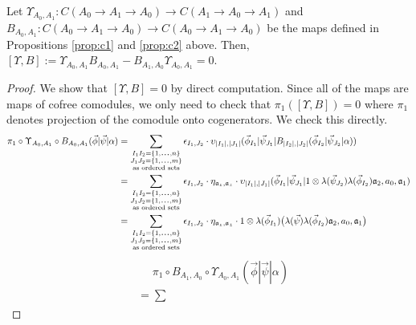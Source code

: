 \begin{prop}
\label{prop:c3}
Let $\Upsilon_{A_0,A_1}: 
C(A_0 \to A_1 \to A_0) \longrightarrow
C(A_1 \to A_0 \to A_1)$ and 
$B_{A_0,A_1}:C(A_0 \to A_1 \to A_0) 
\longrightarrow C(A_0 \to A_1 \to A_0)$ 
be the maps defined in Propositions 
\ref{prop:c1} and \ref{prop:c2} above. 
Then, $[\Upsilon, B] := 
\Upsilon_{A_0,A_1} B_{A_0,A_1} - 
B_{A_1,A_0}\Upsilon_{A_0,A_1} = 0$.
\end{prop}
%
\begin{proof}
We show that $[\Upsilon, B] = 0$ by direct 
computation. Since all of the maps are maps 
of cofree comodules, we only need to check 
that $\pi_1([\Upsilon, B]) = 0$ where 
$\pi_1$ denotes projection of the comodule 
onto cogenerators. We check this directly.
%
\begin{equation*}
\begin{aligned}
\pi_1 \circ \Upsilon_{A_0,A_1} \circ B_{A_0,A_1} 
  (\vec{\phi} | \vec{\psi} | \alpha ) 
&= 
\sum \limits_{\substack{
  I_1I_2 = \{1,\smdots,n\}\\
  J_1J_2 = \{1,\smdots,m\}\\
  \textrm{as ordered sets}}}
\epsilon_{I_1,J_2} \cdot
  \upsilon_{|I_1|, |J_1|} (\vec{\phi}_{I_1} | \vec{\psi}_{J_1} | 
    B_{|I_2|, |J_2|} (\vec{\phi}_{I_2} | \vec{\psi}_{J_2} | \alpha)) \\
&= 
\sum \limits_{\substack{
  I_1I_2 = \{1,\smdots,n\}\\
  J_1J_2 = \{1,\smdots,m\}\\
  \textrm{as ordered sets}}}
\epsilon_{I_1,J_2} \cdot 
\eta_{\mathfrak{a_1},\mathfrak{a_2}} \cdot
\upsilon_{|I_1|, |J_1|} (\vec{\phi}_{I_1} | \vec{\psi}_{J_1} | 
  1 \otimes \lambda(\vec{\psi}_{J_2}) \lambda(\vec{\phi}_{I_2}) 
  \mathfrak{a}_2, a_0, \mathfrak{a}_1) \\
&= 
\sum \limits_{\substack{
  I_1I_2 = \{1,\smdots,n\}\\
  J_1J_2 = \{1,\smdots,m\}\\
  \textrm{as ordered sets}}}
\epsilon_{I_1,J_2} \cdot 
\eta_{\mathfrak{a_1},\mathfrak{a_2}} \cdot
1 \otimes \lambda(\vec{\phi}_{I_1}) \big( 
  \lambda(\vec{\psi}) \lambda(\vec{\phi}_{I_2}) 
  \mathfrak{a}_2, a_0, \mathfrak{a}_1 \big)
\end{aligned}
\end{equation*}
%
\begin{align*}
& \phantom{{}={}}
\pi_1 \circ B_{A_1,A_0} \circ \Upsilon_{A_0,A_1} 
  (\vec{\phi} | \vec{\psi} | \alpha ) \\
&=
\sum \limits_{\substack{
}}
\end{align*}
\end{proof}
